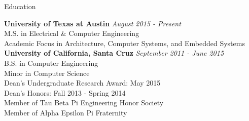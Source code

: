 \documentclass{resume} %
\begin{document}

\begin{rSection}{Education}

{\bf University of Texas at Austin} \hfill {\em August 2015 - Present} \\ 
M.S. in Electrical \& Computer Engineering \\
Academic Focus in Architecture, Computer Systems, and Embedded Systems \\

{\bf University of California, Santa Cruz} \hfill {\em September 2011 - June 2015} \\ 
B.S. in Computer Engineering \\
Minor in Computer Science \\
Dean's Undergraduate Research Award: May 2015 \\
Dean's Honors: Fall 2013 - Spring 2014 \\
Member of Tau Beta Pi Engineering Honor Society \\
Member of Alpha Epsilon Pi Fraternity \\

\end{rSection}

\end{document}
